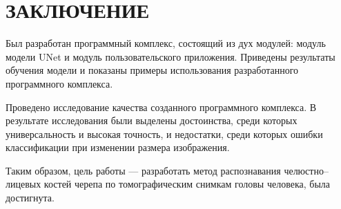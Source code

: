 \section*{ЗАКЛЮЧЕНИЕ}

Был разработан программный комплекс, состоящий из дух модулей: модуль модели UNet и модуль пользовательского приложения. Приведены результаты обучения модели и показаны примеры использования разработанного программного комплекса.

Проведено исследование качества созданного программного комплекса. В результате исследования были выделены достоинства, среди которых универсальность и высокая точность, и недостатки, среди которых ошибки классификации при изменении размера изображения.

Таким образом, цель работы --- разработать метод распознавания челюстно--лицевых костей черепа по томографическим снимкам головы человека, была достигнута.